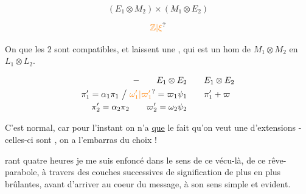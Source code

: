 \[(E_1\otimes M_2)\times(M_1\otimes E_2)\]


\[\unsure{\mathbb Z|\xi}\]


On  que les 2   sont compatibles, et laissent une , qui est un hom de $M_1\otimes M_2$ en $L_1\otimes L_2$.

\[
\begin{aligned}
-\qquad E_1\otimes E_2 &\qquad E_1\otimes E_2\\
\pi'_1=\alpha_1\pi_1\ \big/\ \unsure{\omega'_1|\varpi'_1}=\varpi_1\psi_1&\qquad \pi'_1+\varpi\\
\pi'_2=\alpha_2\pi_2\qquad\varpi'_2=\omega_2\psi_2&
\end{aligned}
\]

C'est normal, car pour l'instant on n'a  \uline{que} le fait qu'on veut une  d'extensions -  celles-ci sont , on a l'embarras du choix !

rant quatre heures je me suis enfoncé dans le sens de ce vécu-là, de ce rêve-parabole, à travers des couches successives de signification de plus en plus brûlantes, avant d'arriver au coeur du message, à son sens simple et evident.

